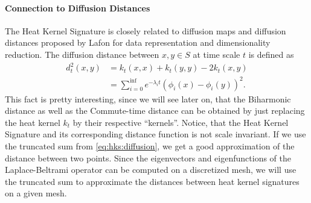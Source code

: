 
\paragraph{Connection to Diffusion Distances}
The Heat Kernel Signature is closely related to diffusion maps and diffusion distances proposed by Lafon \cite{lafon2004diffusion} for data representation and dimensionality reduction.
The diffusion distance between $x,y \in S$ at time scale $t$ is defined as
\begin{equation}
	\begin{split}
		d_t^2(x,y) & = k_t(x,x) + k_t(y,y) - 2k_t(x,y) \\
		& = \sum_{i=0}^{\inf} e^{-\lambda_i t} (\phi_i(x) - \phi_i(y))^2.
	\end{split}
	\label{eq:hks:diffusion}
\end{equation}
This fact is pretty interesting, since we will see later on, that the Biharmonic distance as well as the Commute-time distance can be obtained by just replacing the heat kernel $k_t$ by their respective ``kernels''.
Notice, that the Heat Kernel Signature and its corresponding distance function is not scale invariant.
If we use the truncated sum from \eqref{eq:hks:diffusion}, we get a good approximation of the distance between two points.
Since the eigenvectors and eigenfunctions of the Laplace-Beltrami operator can be computed on a discretized mesh, we will use the truncated sum to approximate the distances between heat kernel signatures on a given mesh.

